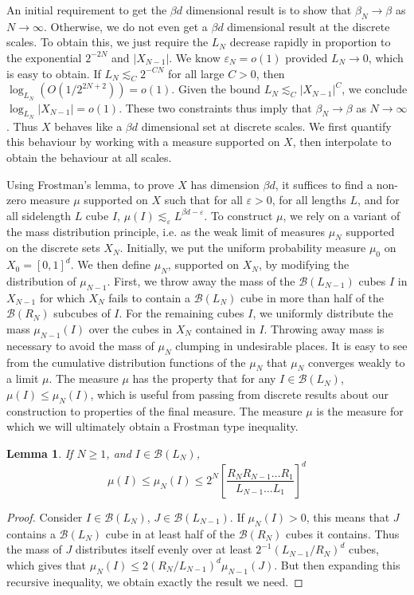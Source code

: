 \documentclass{article}
\theoremstyle{plain}
\newtheorem{lemma}{Lemma}
\theoremstyle{plain}
\begin{document}
\begin{multicols}{2}
An initial requirement to get the $\beta d$ dimensional result is to show that $\beta_N \to \beta$ as $N \to \infty$. Otherwise, we do not even get a $\beta d$ dimensional result at the discrete scales. To obtain this, we just require the $L_N$ decrease rapidly in proportion to the exponential $2^{-2N}$ and $|X_{N - 1}|$. We know $\varepsilon_N = o(1)$ provided $L_N \to 0$, which is easy to obtain. If $L_N \lesssim_C 2^{-CN}$ for all large $C > 0$, then $\log_{L_N}(O(1/2^{2N+2})) = o(1)$. Given the bound $L_N \lesssim_C |X_{N-1}|^C$, we conclude $\log_{L_N} |X_{N-1}| = o(1)$. These two constraints thus imply that $\beta_N \to \beta$ as $N \to \infty$. Thus $X$ behaves like a $\beta d$ dimensional set at discrete scales. We first quantify this behaviour by working with a measure supported on $X$, then interpolate to obtain the behaviour at all scales.

Using Frostman's lemma, to prove $X$ has dimension $\beta d$, it suffices to find a non-zero measure $\mu$ supported on $X$ such that for all $\varepsilon > 0$, for all lengths $L$, and for all sidelength $L$ cube $I$, $\mu(I) \lesssim_\varepsilon L^{\beta d - \varepsilon}$. To construct $\mu$, we rely on a variant of the mass distribution principle, i.e. as the weak limit of measures $\mu_N$ supported on the discrete sets $X_N$. Initially, we put the uniform probability measure $\mu_0$ on $X_0 = [0,1]^d$. We then define $\mu_N$, supported on $X_N$, by modifying the distribution of $\mu_{N-1}$. First, we throw away the mass of the $\mathcal{B}(L_{N-1})$ cubes $I$ in $X_{N-1}$ for which $X_N$ fails to contain a $\mathcal{B}(L_N)$ cube in more than half of the $\mathcal{B}(R_N)$ subcubes of $I$. For the remaining cubes $I$, we uniformly distribute the mass $\mu_{N-1}(I)$ over the cubes in $X_N$ contained in $I$. Throwing away mass is necessary to avoid the mass of $\mu_N$ clumping in undesirable places. It is easy to see from the cumulative distribution functions of the $\mu_N$ that $\mu_N$ converges weakly to a limit $\mu$. The measure $\mu$ has the property that for any $I \in \mathcal{B}(L_N)$, $\mu(I) \leq \mu_N(I)$, which is useful from passing from discrete results about our construction to properties of the final measure. The measure $\mu$ is the measure for which we will ultimately obtain a Frostman type inequality.

\begin{lemma}
	If $N \geq 1$, and $I \in \mathcal{B}(L_N)$,
	\[ \mu(I) \leq \mu_N(I) \leq 2^N \left[ \frac{R_N R_{N-1} \dots R_1}{L_{N-1} \dots L_1} \right]^d \]
\end{lemma}
\begin{proof}
	Consider $I \in \mathcal{B}(L_N)$, $J \in \mathcal{B}(L_{N-1})$. If $\mu_N(I) > 0$, this means that $J$ contains a $\mathcal{B}(L_N)$ cube in at least half of the $\mathcal{B}(R_N)$ cubes it contains. Thus the mass of $J$ distributes itself evenly over at least $2^{-1} (L_{N-1}/R_N)^d$ cubes, which gives that $\mu_N(I) \leq 2(R_N/L_{N-1})^d \mu_{N-1}(J)$. But then expanding this recursive inequality, we obtain exactly the result we need.
\end{proof}


\end{multicols}
\end{document}
